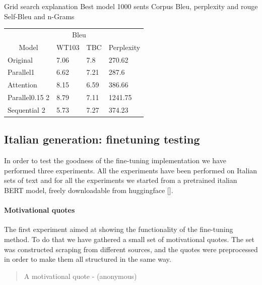 \documentclass[10pt,twocolumn,letterpaper]{article}
\begin{document}
Grid search explanation
Best model 1000 sents
Corpus Bleu, perplexity and rouge
Self-Bleu and n-Grams
\begin{table}[]
\begin{tabular}{llll}
\hline
\multicolumn{1}{c}{} & \multicolumn{2}{c}{Bleu} & \multicolumn{1}{c}{\multirow{}{}{}} \\ \cline{2-3}
\multicolumn{1}{c}{\multirow{}{}{Model}}   & WT103       & TBC        & \multicolumn{1}{c}{\multirow{}{}{Perplexity}}                                \\ \hline
Original \cite{wang2019bert}                             & 7.06        & 7.8        & 270.62                                                \\
Parallel1                                 & 6.62        & 7.21       & 287.6                                                \\
Attention                                 & 8.15        & 6.59       & 386.66                                              \\
Parallel0.15 2                             & 8.79            & 7.11           & 1241.75                                                 \\
Sequential 2                               & 5.73            & 7.27           & 374.23                                                 \\ \hline
\end{tabular}
\end{table}


\subsection{Italian generation: finetuning testing}
In order to test the goodness of the fine-tuning implementation we have performed three experiments.
All the experiments have been performed on Italian sets of text and for all the experiments we started from a pretrained
italian BERT model, freely downloadable from huggingface [].

\paragraph{Motivational quotes} The first experiment aimed at showing the functionality of the fine-tuning method.
To do that we have gathered a small set of motivational quotes.
The set was constructed scraping from different sources, and the quotes were preprocessed in order to make them
all structured in the same way.
\begin{quote}
   A motivational quote - (anonymous)
\end{quote}
\end{document}
